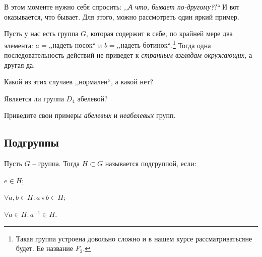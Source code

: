 \setcounter{footnote}{1}
В этом моменте нужно себя спросить: \emph{,,А что, бывает по-другому?!``} И вот оказывается, что бывает.
Для этого, можно рассмотреть один яркий пример. 
\begin{example}
    Пусть у нас есть группа $G$, которая содержит в себе, по крайней мере два элемента: 
    $a = \text{,,надеть носок``}$ и $b = \text{,,надеть ботинок``}$.\footnote{
    Такая группа устроена довольно сложно и в нашем курсе рассматриватьсяне будет. Ее название $F_2$.}
    Тогда одна последовательность действий не приведет к \emph{странным взглядам окружающих,} а другая да.
\end{example}

\begin{practice}
   Какой из этих случаев ,,нормален``, а какой нет? 
\end{practice}

\begin{practice}
    Является ли группа $D_4$ абелевой?
\end{practice}

\begin{practice}
    Приведите свои примеры \emph{абелевых} и \emph{неабелевых} групп. 
\end{practice}

\subsection{Подгруппы}
\begin{definition}
    [Подгруппа]
    Пусть $G$ -- группа. Тогда $H \subset G$ называется подгруппой, если:
    \begin{conditions}
    \item $e \in H$;
    \item $\forall a, b \in H: a \star b \in H$;
    \item $\forall a \in H: a^{-1} \in H$.
    \end{conditions}
\end{definition}

